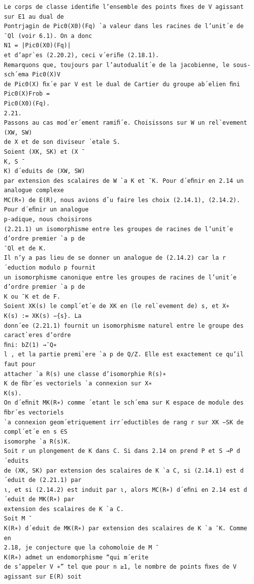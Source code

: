 \documentclass[11pt]{article}
\begin{document}
\begin{Verbatim}[breaklines=true,fontsize=\small]
Le corps de classe identiﬁe l’ensemble des points ﬁxes de V agissant sur E1 au dual de
Pontrjagin de Pic0(X0)(Fq) `a valeur dans les racines de l’unit´e de ¯Ql (voir 6.1). On a donc
N1 = |Pic0(X0)(Fq)|
et d’apr`es (2.20.2), ceci v´eriﬁe (2.18.1).
Remarquons que, toujours par l’autodualit´e de la jacobienne, le sous-sch´ema Pic0(X)V
de Pic0(X) ﬁx´e par V est le dual de Cartier du groupe ab´elien ﬁni Pic0(X)Frob =
Pic0(X0)(Fq).
2.21.
Passons au cas mod´er´ement ramiﬁ´e. Choisissons sur W un rel`evement (XW, SW)
de X et de son diviseur ´etale S.
Soient (XK, SK) et (X ¯
K, S ¯
K) d´eduits de (XW, SW)
par extension des scalaires de W `a K et ¯K. Pour d´eﬁnir en 2.14 un analogue complexe
MC(R∗) de E(R), nous avions dˆu faire les choix (2.14.1), (2.14.2). Pour d´eﬁnir un analogue
p-adique, nous choisirons
(2.21.1) un isomorphisme entre les groupes de racines de l’unit´e d’ordre premier `a p de
¯Ql et de K.
Il n’y a pas lieu de se donner un analogue de (2.14.2) car la r´eduction modulo p fournit
un isomorphisme canonique entre les groupes de racines de l’unit´e d’ordre premier `a p de
K ou ¯K et de F.
Soient XK(s) le compl´et´e de XK en (le rel`evement de) s, et X∗
K(s) := XK(s) −{s}. La
donn´ee (2.21.1) fournit un isomorphisme naturel entre le groupe des caract`eres d’ordre
ﬁni: bZ(1) →¯Q∗
l , et la partie premi`ere `a p de Q/Z. Elle est exactement ce qu’il faut pour
attacher `a R(s) une classe d’isomorphie R(s)∗
K de ﬁbr´es vectoriels `a connexion sur X∗
K(s).
On d´eﬁnit MK(R∗) comme ´etant le sch´ema sur K espace de module des ﬁbr´es vectoriels
`a connexion geom´etriquement irr´eductibles de rang r sur XK −SK de compl´et´e en s ∈S
isomorphe `a R(s)K.
Soit r un plongement de K dans C. Si dans 2.14 on prend P et S →P d´eduits
de (XK, SK) par extension des scalaires de K `a C, si (2.14.1) est d´eduit de (2.21.1) par
ι, et si (2.14.2) est induit par ι, alors MC(R∗) d´eﬁni en 2.14 est d´eduit de MK(R∗) par
extension des scalaires de K `a C.
Soit M ¯
K(R∗) d´eduit de MK(R∗) par extension des scalaires de K `a ¯K. Comme en
2.18, je conjecture que la cohomoloie de M ¯
K(R∗) admet un endomorphisme “qui m´erite
de s’appeler V ∗” tel que pour n ≥1, le nombre de points ﬁxes de V agissant sur E(R) soit


\end{Verbatim}
\end{document}
